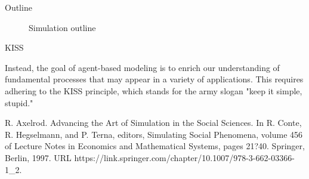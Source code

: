 \documentclass[9pt]{beamer}
\begin{document}
\begin{frame}{Outline}

\begin{figure}[H]
\center
{}
\caption{Simulation outline}
\label{outline}
\end{figure}


\end{frame}

\begin{frame}{KISS}

Instead, the goal of agent-based modeling is to enrich our understanding of fundamental processes that may appear in a variety of applications. This requires adhering to the KISS principle, which stands for the army slogan "keep it simple, stupid."

R. Axelrod. Advancing the Art of Simulation in the Social Sciences. In R. Conte, R. Hegselmann, and P. Terna, editors, Simulating Social Phenomena, volume 456 of Lecture Notes in Economics and Mathematical Systems, pages 21?40. Springer, Berlin, 1997. URL https://link.springer.com/chapter/10.1007/978-3-662-03366-1\_2.


\end{frame}
\end{document}
